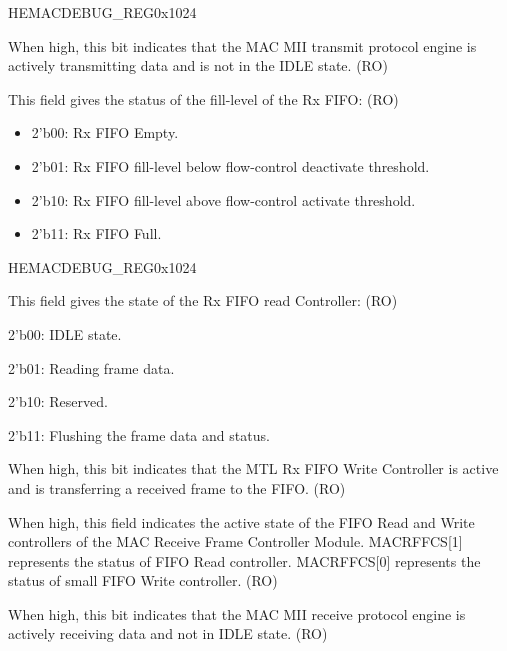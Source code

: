 \begin{register}{H}{EMACDEBUG\_REG}{0x1024}
\begin{regdesc}
\begin{reglist}
\item [MACTPES]When high, this bit indicates that the MAC  MII transmit protocol engine is actively transmitting data and is not in the IDLE state. (RO)
\item [MTLRFFLS]This field gives the status of the fill-level of the Rx FIFO: (RO) \begin{itemize}
\item 2'b00: Rx FIFO Empty. \item 2'b01: Rx FIFO fill-level below flow-control deactivate threshold. \item 2'b10: Rx FIFO fill-level above flow-control activate threshold. \item 2'b11: Rx FIFO Full. \end{itemize}


\item [Continued on the next page...]
\end{reglist}\end{regdesc}
\end{register}

\addtocounter{Regfloat}{-1}
\begin{register}{H}{EMACDEBUG\_REG}{0x1024}
\begin{regdesc}\begin{reglist}
\item [Continued from the previous page...]
\item [MTLRFRCS]This field gives the state of the Rx FIFO read Controller: (RO) \item 2'b00: IDLE state. \item 2'b01: Reading frame data. \item 2'b10: Reserved. \item 2'b11: Flushing the frame data and status.
\item [MTLRFWCAS]When high, this bit indicates that the MTL Rx FIFO Write Controller is active and is transferring a received frame to the FIFO. (RO)
\item [MACRFFCS]When high, this field indicates the active state of the FIFO Read and Write controllers of the MAC Receive Frame Controller Module. MACRFFCS[1] represents the status of FIFO Read controller. MACRFFCS[0] represents the status of small FIFO Write controller. (RO)
\item [MACRPES]When high, this bit indicates that the MAC MII receive protocol engine is actively receiving data and not in IDLE state. (RO)
\end{reglist}\end{regdesc}
\end{register}

